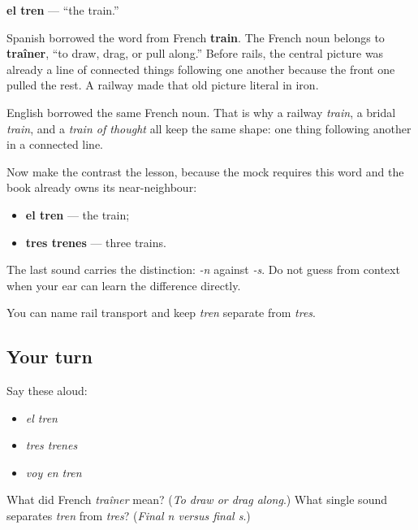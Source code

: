 \begin{cousinweb}
\textbf{el tren} — \textquotedblleft{}the train.\textquotedblright{}

Spanish borrowed the word from French \textbf{train}. The French noun belongs to \textbf{traîner}, \textquotedblleft{}to draw, drag, or pull along.\textquotedblright{} Before rails, the central picture was already a line of connected things following one another because the front one pulled the rest. A railway made that old picture literal in iron.

English borrowed the same French noun. That is why a railway \emph{train}, a bridal \emph{train}, and a \emph{train of thought} all keep the same shape: one thing following another in a connected line.

Now make the contrast the lesson, because the mock requires this word and the book already owns its near-neighbour:

\begin{itemize}
\raggedright
  \item \textbf{el tren} — the train;
  \item \textbf{tres trenes} — three trains.
\end{itemize}

The last sound carries the distinction: \emph{-n} against \emph{-s}. Do not guess from context when your ear can learn the difference directly.
\end{cousinweb}

\begin{grammarlens}[title={What you've built}]
You can name rail transport and keep \emph{tren} separate from \emph{tres}.
\end{grammarlens}

\subsection*{Your turn}
Say these aloud:

\begin{itemize}
\raggedright
  \item \emph{el tren}
  \item \emph{tres trenes}
  \item \emph{voy en tren}
\end{itemize}

\begin{tcolorbox}[breakable,colback=teal!4,colframe=teal!35!black,title={Before you move on}]
What did French \emph{traîner} mean? (\emph{To draw or drag along}.) What single sound separates \emph{tren} from \emph{tres}? (\emph{Final n versus final s}.)
\end{tcolorbox}
